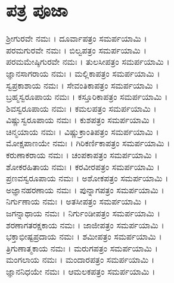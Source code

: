 \section{ಪತ್ರ ಪೂಜಾ }
ಶ್ರೀಗುರವೇ ನಮಃ । ದೂರ್ವಾಪತ್ರಂ ಸಮರ್ಪಯಾಮಿ ।\\
ಪರಮಗುರವೇ ನಮಃ । ಬಿಲ್ವಪತ್ರಂ ಸಮರ್ಪಯಾಮಿ ।\\
ಪರಮಮೇಷ್ಠಿಗುರವೇ ನಮಃ । ತುಲಸೀಪತ್ರಂ ಸಮರ್ಪಯಾಮಿ ।\\
ಜ್ಞಾನಸಾಗರಾಯ ನಮಃ । ಮಲ್ಲಿಕಾಪತ್ರಂ ಸಮರ್ಪಯಾಮಿ ।\\
ಸ್ವಪ್ರಕಾಶಾಯ ನಮಃ । ಸೇವಂತಿಕಾಪತ್ರಂ ಸಮರ್ಪಯಾಮಿ ।\\
ಬ್ರಹ್ಮಸ್ವರೂಪಾಯ ನಮಃ । ಕಸ್ತೂರಿಕಾಪತ್ರಂ ಸಮರ್ಪಯಾಮಿ ।\\
ಶಿವಸ್ವರೂಪಾಯ ನಮಃ । ಕಮಲಪತ್ರಂ ಸಮರ್ಪಯಾಮಿ ।\\
ವಿಷ್ಣುಸ್ವರೂಪಾಯ ನಮಃ । ಕುಶಪತ್ರಂ ಸಮರ್ಪಯಾಮಿ ।\\
ಚಿನ್ಮಯಾಯ ನಮಃ । ವಿಷ್ಣುಕ್ರಾಂತಿಪತ್ರಂ ಸಮರ್ಪಯಾಮಿ ।\\
ಮೋಕ್ಷಪಾಣಯೇ ನಮಃ । ಗಿರಿಕರ್ಣಿಕಾಪತ್ರಂ ಸಮರ್ಪಯಾಮಿ ।\\
ಕರುಣಾಕರಾಯ ನಮಃ । ಚಂಪಕಾಪತ್ರಂ ಸಮರ್ಪಯಾಮಿ ।\\
ಶೋಕರಹಿತಾಯ ನಮಃ । ಕರವೀರಪತ್ರಂ ಸಮರ್ಪಯಾಮಿ ।\\
ಪ್ರಣವಸ್ವರೂಪಾಯ ನಮಃ । ಅಶೋಕಪತ್ರಂ ಸಮರ್ಪಯಾಮಿ ।\\
ಅಜ್ಞಾನಹರಣಾಯ ನಮಃ । ಪುನ್ನಾಗಪತ್ರಂ ಸಮರ್ಪಯಾಮಿ ।\\
ನಿರ್ಗುಣಾಯ ನಮಃ । ಅತಸೀಪತ್ರಂ ಸಮರ್ಪಯಾಮಿ ।\\
ಜಗನ್ನಾಥಾಯ ನಮಃ । ನಿರ್ಗುಂಡೀಪತ್ರಂ ಸಮರ್ಪಯಾಮಿ ।\\
ಶರಣಾಗತರಕ್ಷಕಾಯ ನಮಃ । ಜಾಜೀಪತ್ರಂ ಸಮರ್ಪಯಾಮಿ ।\\
ಭಕ್ತಾಭೀಷ್ಟಪ್ರದಾಯ ನಮಃ । ಶಮೀಪತ್ರಂ ಸಮರ್ಪಯಾಮಿ ।\\
ತ್ರಿಗುಣಾತ್ಮಕಾಯ ನಮಃ । ಮರುಗಪತ್ರಂ ಸಮರ್ಪಯಾಮಿ ।\\
ಮಂಗಲಾಯ ನಮಃ । ಮಂದಾರಪತ್ರಂ ಸಮರ್ಪಯಾಮಿ ।\\
ಜ್ಞಾನನಿಧಯೇ ನಮಃ । ಆಮಲಕಪತ್ರಂ ಸಮರ್ಪಯಾಮಿ ।
